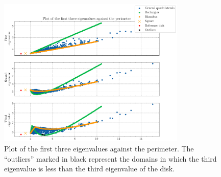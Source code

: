 \begin{figure}[!htb]
    \centering
    \begin{minipage}[c]{0.8\textwidth}
        \centering
        \includegraphics[width=0.8\textwidth]{Images/Dirac/quad/first_three_eigenvalues_quad_m_1.png}
        \caption{Plot of the first three eigenvalues against the perimeter. The ``outliers'' marked in black represent the domains in which the third eigenvalue is less than the third eigenvalue of the disk.}
        \label{dirac_first_three_eigenvalues_quad_m_1}
    \end{minipage}

    \vspace{0.5cm}


\end{figure}
